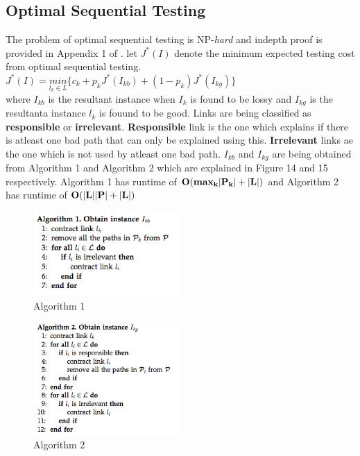 \documentclass[10pt]{sigplan-proc-varsize}
\begin{document}
\subsection{Optimal Sequential Testing}
The problem of optimal sequential testing is NP-{\it hard} and indepth proof is provided in Appendix 1 of \cite{krishna:12}. let $J^*(I)$ denote the minimum expected testing cost from optimal sequential testing. \\
$J^*(I) = \underset{l_k \in L}{min}\{c_k+p_kJ^*(I_{kb})+(1-p_k)J^*(I_{kg})\}$ \\
where $I_{kb}$ is the resultant instance when $I_{k}$ is found to be lossy and $I_{kg}$ is the resultanta instance $l_{k}$ is fouund to be good. Links are being classified as {\bf responsible } or {\bf irrelevant}. {\bf Responsible} link is the one which explains if there is atleast one bad path that can only be explained using this.  {\bf Irrelevant} links ae the one which is not used by atleast one bad path. $I_{kb}$ and $I_{kg}$ are being obtained from Algorithm 1 and Algorithm 2 which are explained in Figure 14 and 15 respectively. Algorithm 1 has runtime of ${\bf O(max_k|P_k|+|L|)}$ and Algorithm 2 has runtime of ${\bf O(|L||P|+|L|)}$

\begin{figure}[h!]
  \caption{Algorithm 1}
  \centering
    \includegraphics[width=0.5\textwidth]{Fig16}
\end{figure}

\begin{figure}[h!]
  \caption{Algorithm 2}
  \centering
    \includegraphics[width=0.5\textwidth]{Fig17}
\end{figure}

\appendix
%
%


\end{document}
